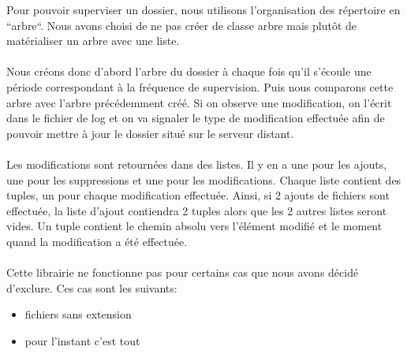 Pour pouvoir superviser un dossier, nous utilisons l'organisation des répertoire en ``arbre``.
Nous avons choisi de ne pas créer de classe arbre mais plutôt de matérialiser un arbre avec une liste.\\
\\
Nous créons donc d'abord l'arbre du dossier à chaque fois qu'il s'écoule une période correspondant à la fréquence de supervision. 
Puis nous comparons cette arbre avec l'arbre précédemment créé. 
Si on observe une modification, on l'écrit dans le fichier de log et on va signaler le type de modification effectuée 
afin de pouvoir mettre à jour le dossier situé sur le serveur distant.\\
\\
Les modifications sont retournées dans des listes. Il y en a une pour les ajouts, une pour les suppressions et une pour les modifications.
Chaque liste contient des tuples, un pour chaque modification effectuée. 
Ainsi, si 2 ajouts de fichiers sont effectuée, la liste d'ajout contiendra 2 tuples alors que les 2 autres listes seront vides.
Un tuple contient le chemin absolu vers l'élément modifié et le moment quand la modification a été effectuée.\\
\\
Cette librairie ne fonctionne pas pour certains cas que nous avons décidé d'exclure. Ces cas sont les suivants:
\begin{itemize}
\item fichiers sans extension
\item pour l'instant c'est tout
\end{itemize}



